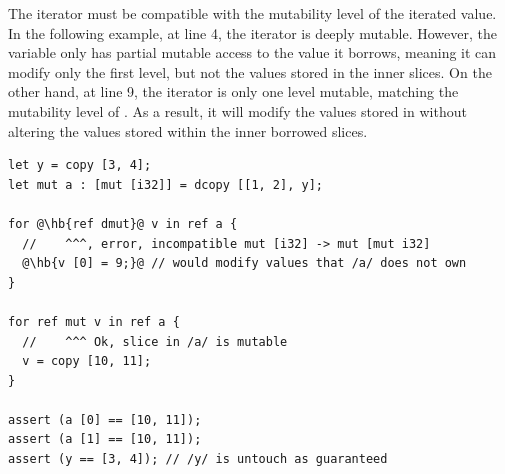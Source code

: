 The iterator must be compatible with the mutability level of the iterated value.
In the following example, at line 4, the iterator is deeply mutable. However,
the variable  only has partial mutable access to the value it borrows,
meaning it can modify only the first level, but not the values stored in the
inner slices. On the other hand, at line 9, the iterator is only one level
mutable, matching the mutability level of . As a result, it will modify
the values stored in  without altering the values stored within the
inner borrowed slices.

\begin{lstlisting}[style=coloredverbatim, escapechar=@]
let y = copy [3, 4];
let mut a : [mut [i32]] = dcopy [[1, 2], y];

for @\hb{ref dmut}@ v in ref a {
  //    ^^^, error, incompatible mut [i32] -> mut [mut i32]
  @\hb{v [0] = 9;}@ // would modify values that /a/ does not own
}

for ref mut v in ref a {
  //    ^^^ Ok, slice in /a/ is mutable
  v = copy [10, 11];
}

assert (a [0] == [10, 11]);
assert (a [1] == [10, 11]);
assert (y == [3, 4]); // /y/ is untouch as guaranteed

\end{lstlisting}

\vfill%
\pagebreak
